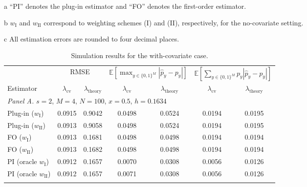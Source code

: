 \documentclass[11pt]{article}
\begin{document}
\begin{table}[htp!]
\begin{threeparttable}
\begin{tabular}{lcccccc}
\bottomrule
\end{tabular}
\begin{tablenotes}
\footnotesize
\item[a] ``PI'' denotes the plug-in estimator and ``FO'' denotes the first-order estimator.
\item[b] $w_{\mathrm{I}}$ and $w_{\mathrm{II}}$ correspond to weighting schemes (I) and (II), respectively, for the no-covariate setting.
\item[c] All estimation errors are rounded to four decimal places.
\end{tablenotes}
\end{threeparttable}
\end{table}

\begin{table}[htp!]
\centering
\begin{threeparttable}
\caption{Simulation results for the with-covariate case.}
\label{tab:conditional}
\begin{tabular}{lcccccc}
\toprule
& \multicolumn{2}{c}{RMSE}
& \multicolumn{2}{c}{$\mathbb{E}\!\left[\max_{y\in\{0,1\}^M}\left|\hat{p}_y-p_y\right|\right]$}
& \multicolumn{2}{c}{$\mathbb{E}\!\left[\sum_{y\in\{0,1\}^M} p_y\left|\hat{p}_y-p_y\right|\right]$} \\
\cmidrule(lr){2-3}\cmidrule(lr){4-5}\cmidrule(lr){6-7}
Estimator & $\lambda_{\mathrm{cv}}$ & $\lambda_{\mathrm{theory}}$
& $\lambda_{\mathrm{cv}}$ & $\lambda_{\mathrm{theory}}$
& $\lambda_{\mathrm{cv}}$ & $\lambda_{\mathrm{theory}}$ \\
\midrule
\multicolumn{7}{l}{\textit{Panel A.} $s=2$, $M=4$, $N=100$, $x=0.5$, $h=0.1634$} \\
Plug-in ($w_{\mathrm{I}}$)         & 0.0915 & 0.9042 & 0.0498 & 0.0524 & 0.0194 & 0.0195 \\
Plug-in ($w_{\mathrm{II}}$)        & 0.0913 & 0.9058 & 0.0498 & 0.0524 & 0.0194 & 0.0195 \\
FO ($w_{\mathrm{I}}$)              & 0.0913 & 0.1681 & 0.0498 & 0.0498 & 0.0194 & 0.0194 \\
FO ($w_{\mathrm{II}}$)             & 0.0913 & 0.1682 & 0.0498 & 0.0498 & 0.0194 & 0.0194 \\
PI (oracle $w_{\mathrm{I}}$)       & 0.0912 & 0.1657 & 0.0070 & 0.0308 & 0.0056 & 0.0126 \\
PI (oracle $w_{\mathrm{II}}$)      & 0.0912 & 0.1657 & 0.0071 & 0.0308 & 0.0056 & 0.0126 \\
\addlinespace
\multicolumn{7}{l}{\textit{Panel B.} $s=5$, $M=4$, $N=100$, $x=0.5$, $h=0.1634$} \\

\end{tabular}
\end{threeparttable}
\end{table}
\end{document}
